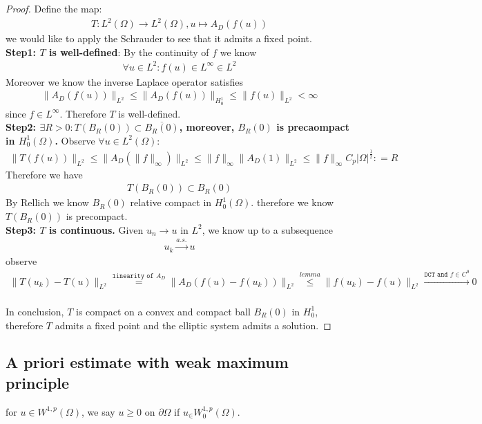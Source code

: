 \begin{proof}
Define the map:
\begin{align*}
	T: L^2(\Omega) \rightarrow L^2(\Omega), u \mapsto A_D(f(u))
\end{align*}
we would like to apply the Schrauder to see that it admits a fixed point. 
	\quad\\
	\textbf{Step1:  $T$ is well-defined}: By the continuity of $f$ we know
	\begin{align*}
		\forall u \in L^2: f(u) \in L^\infty \in L^2
	\end{align*}
	Moreover we know the inverse Laplace operator satisfies
	\begin{align*}
		 \|A_D(f(u))\|_{L^2} \le \|A_D(f(u))\|_{H^1_0} \le \|f(u)\|_{L^2} < \infty
	\end{align*}
	since $f \in L^\infty$. Therefore $T$ is well-defined.\\
	\textbf{Step2: $\exists R > 0: T(B_R(0)) \subset \overline{B_R(0)}$, moreover, $B_R(0)$ is precaompact in $H^1_0(\Omega)$. } Observe $\forall u \in L^2(\Omega):$
	\begin{align*}
		\|T(f(u))\|_{L^2} \le \|A_D(\|f\|_\infty)\|_{L^2} 
		\le \|f\|_\infty \|A_D(1)\|_{L^2} \le \|f\|_\infty C_p |\Omega|^{\frac{1}{2}}: = R
	\end{align*}
	Therefore we have 
	\begin{align*}
		T(B_R(0)) \subset B_R(0)
	\end{align*}
	By Rellich we know $B_R(0)$ relative compact in $H^1_0(\Omega)$. 
	therefore we know $T(B_R(0))$ is precompact.
	\\
	\textbf{Step3: $T$ is continuous.} Given $u_n \rightarrow u$ in $L^2$, we know up to a subsequence 
	\begin{align*}
		u_k  \overset{a.s.}{\rightarrow} u
	\end{align*}
	observe
	\begin{align*}
		\|T(u_k) - T(u)\|_{L^2} 
		\overset{\texttt{linearity of $A_D$}}{=} \|A_D(f(u) - f(u_k))\|_{L^2} 
		\overset{lemma}{\le} \|f(u_k) - f(u)\|_{L^2} 
		\overset{\texttt{DCT and $f \in C^0$}}{\rightarrow} 0
	\end{align*}
	\\
	In conclusion, $T$ is compact on a convex and compact ball $B_R(0)$ in $H^1_0$, therefore $T$ admits a fixed point and the elliptic system admits a solution.
\end{proof}


\subsection{A priori estimate with weak maximum principle}
\begin{definition}
	for $u \in W^{1, p}(\Omega)$, we say $u \ge 0$ on $\partial\Omega$ if $u_ \in W^{1, p}_0(\Omega)$.
\end{definition}

